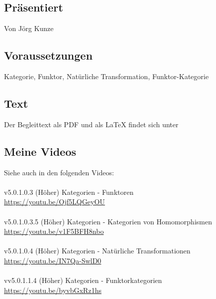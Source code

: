 \documentclass[a4paper]{amsart}
\theoremstyle{definition}
\begin{document}
\subsection*{Präsentiert}
Von Jörg Kunze

\subsection*{Voraussetzungen}
Kategorie, Funktor, Natürliche Transformation, Funktor-Kategorie

\subsection*{Text}
Der Begleittext als PDF und als LaTeX findet sich unter
{\tiny
   \url{}
}

\subsection*{Meine Videos}
Siehe auch in den folgenden Videos:\\
\\
v5.0.1.0.3 (Höher) Kategorien - Funktoren\\
\url{https://youtu.be/Ojf5LQGeyOU}\\
\\
v5.0.1.0.3.5 (Höher) Kategorien - Kategorien von Homomorphismen\\
\url{https://youtu.be/v1F5BFH8nbo}\\
\\
v5.0.1.0.4 (Höher) Kategorien - Natürliche Transformationen\\
\url{https://youtu.be/IN7Qa-SwlD0}\\
\\
vv5.0.1.1.4 (Höher) Kategorien - Funktorkategorien\\
\url{https://youtu.be/byvbGxRz1hs}\\
\\
\end{document}
